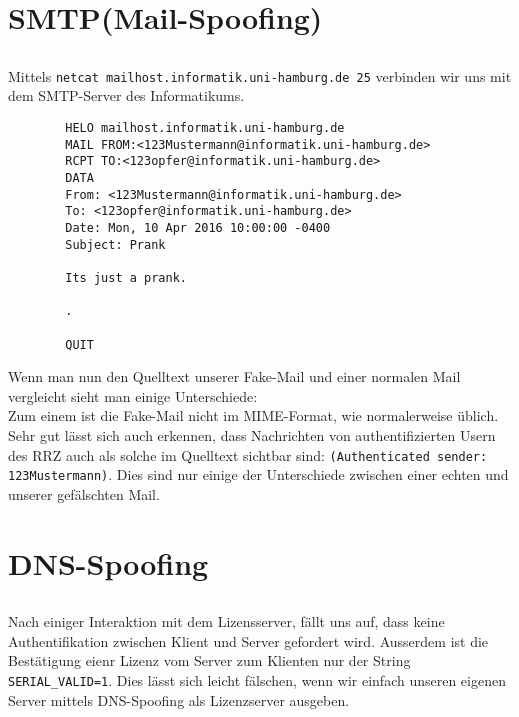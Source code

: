 \documentclass{scrartcl}
\begin{document}
  \section{SMTP(Mail-Spoofing)}
  \label{sec:SMTP(Mail-Spoofing)}
    \subsection{}
    \label{sub:2.1}
      Mittels \texttt{netcat mailhost.informatik.uni-hamburg.de 25} verbinden
      wir uns mit dem SMTP-Server des Informatikums.
      \begin{lstlisting}
        HELO mailhost.informatik.uni-hamburg.de
        MAIL FROM:<123Mustermann@informatik.uni-hamburg.de>
        RCPT TO:<123opfer@informatik.uni-hamburg.de>
        DATA
        From: <123Mustermann@informatik.uni-hamburg.de>
        To: <123opfer@informatik.uni-hamburg.de>
        Date: Mon, 10 Apr 2016 10:00:00 -0400
        Subject: Prank

        Its just a prank.

        .

        QUIT
      \end{lstlisting}
      Wenn man nun den Quelltext unserer Fake-Mail und einer normalen Mail
      vergleicht sieht man einige Unterschiede:\\
      Zum einem ist die Fake-Mail nicht im MIME-Format, wie normalerweise
      üblich. Sehr gut lässt sich auch erkennen, dass Nachrichten von
      authentifizierten Usern des RRZ auch als solche im Quelltext sichtbar
      sind: \texttt{(Authenticated sender: 123Mustermann)}. Dies sind nur
      einige der Unterschiede zwischen einer echten und unserer gefälschten
      Mail.

  \section{DNS-Spoofing}
  \label{sec:DNS-Spoofing}
    \subsection{}
    \label{sub:3.1}
      Nach einiger Interaktion mit dem Lizensserver, fällt uns auf, dass keine
      Authentifikation zwischen Klient und Server gefordert wird. Ausserdem ist
      die Bestätigung eienr Lizenz vom Server zum Klienten nur der String
      \texttt{SERIAL\_VALID=1}. Dies lässt sich leicht fälschen, wenn wir
      einfach unseren eigenen Server mittels DNS-Spoofing als Lizenzserver
      ausgeben.
\end{document}
